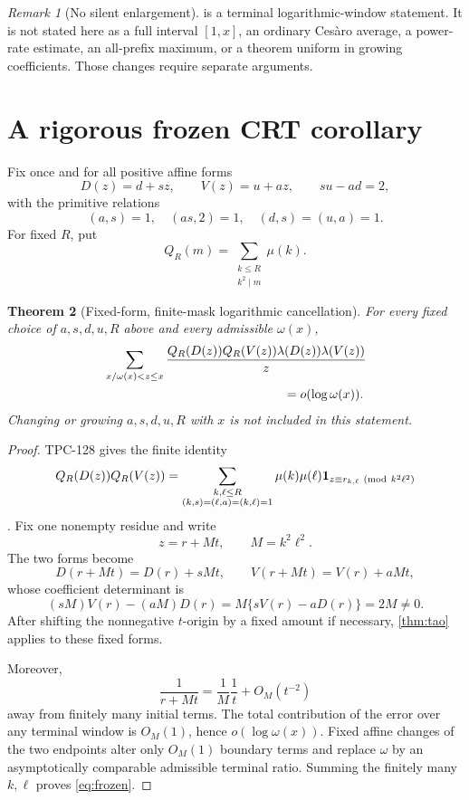 \documentclass[11pt]{article}
\newtheorem{theorem}{Theorem}[section]
\theoremstyle{definition}
\theoremstyle{remark}
\newtheorem{remark}[theorem]{Remark}
\newcommand{\one}{\mathbf 1}
\begin{document}
\begin{remark}[No silent enlargement]
 is a terminal logarithmic-window statement.  It is
not stated here as a full interval \([1,x]\), an ordinary Ces\`aro
average, a power-rate estimate, an all-prefix maximum, or a theorem
uniform in growing coefficients.  Those changes require separate
arguments.
\end{remark}

\section{A rigorous frozen CRT corollary}

Fix once and for all positive affine forms
\[
 D(z)=d+sz,\qquad V(z)=u+az,\qquad su-ad=2,
\]
with the primitive relations
\[
 (a,s)=1,\quad(as,2)=1,\quad(d,s)=(u,a)=1.
\]
For fixed \(R\), put
\[
 Q_R(m)=\sum_{\substack{k\le R\\k^2\mid m}}\mu(k).
\]

\begin{theorem}[Fixed-form, finite-mask logarithmic cancellation]
\label{thm:frozen}
For every fixed choice of \(a,s,d,u,R\) above and every admissible
\(\omega(x)\),
\begin{align}
 &\sum_{x/\omega(x)<z\le x}
 \frac{
 Q_R(D(z))Q_R(V(z))
 \lambda(D(z))\lambda(V(z))}
 {z}
\notag\\
 &\hspace{5cm}=o(\log\omega(x)).
\label{eq:frozen}
\end{align}
Changing or growing \(a,s,d,u,R\) with \(x\) is not included in this
statement.
\end{theorem}

\begin{proof}
TPC-128 gives the finite identity
\[
 Q_R(D(z))Q_R(V(z))
 =
 \sum_{\substack{k,\ell\le R\\
 (k,s)=(\ell,a)=(k,\ell)=1}}
 \mu(k)\mu(\ell)
 \one_{z\equiv r_{k,\ell}\ ({\rm mod}\ k^2\ell^2)}
\]
\citep{WangTPC128}.  Fix one nonempty residue and write
\[
 z=r+Mt,\qquad M=k^2\ell^2.
\]
The two forms become
\[
 D(r+Mt)=D(r)+sMt,\qquad
 V(r+Mt)=V(r)+aMt,
\]
whose coefficient determinant is
\[
 (sM)V(r)-(aM)D(r)
 =M\{sV(r)-aD(r)\}=2M\ne0.
\]
After shifting the nonnegative \(t\)-origin by a fixed amount if
necessary, \cref{thm:tao} applies to these fixed forms.

Moreover,
\[
 \frac1{r+Mt}=\frac1M\frac1t+O_M(t^{-2})
\]
away from finitely many initial terms.  The total contribution of
the error over any terminal window is \(O_M(1)\), hence
\(o(\log\omega(x))\).  Fixed affine changes of the two endpoints
alter only \(O_M(1)\) boundary terms and replace \(\omega\) by an
asymptotically comparable admissible terminal ratio.  Summing the
finitely many \(k,\ell\) proves \eqref{eq:frozen}.
\end{proof}
\end{document}
